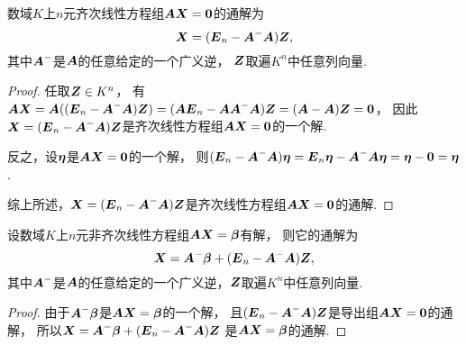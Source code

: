 \begin{theorem}[齐次线性方程组的解的结构定理]\label{theorem:线性方程组.齐次线性方程组的解的结构定理}
数域\(K\)上\(n\)元齐次线性方程组\(\vb{A} \vb{X} = \vb0\)的通解为\begin{equation}\label{equation:线性方程组.齐次线性方程组的通解}
	\vb{X}=(\vb{E}_n - \vb{A}^- \vb{A}) \vb{Z},
\end{equation}
其中\(\vb{A}^-\)是\(\vb{A}\)的任意给定的一个广义逆，
\(\vb{Z}\)取遍\(K^n\)中任意列向量.
\begin{proof}
任取\(\vb{Z} \in K^n\)，
有\(
	\vb{A} \vb{X}
	= \vb{A}
	(
		(\vb{E}_n - \vb{A}^- \vb{A})
		\vb{Z}
	)
	= (\vb{A} \vb{E}_n - \vb{A} \vb{A}^- \vb{A}) \vb{Z}
	= (\vb{A} - \vb{A}) \vb{Z}
	= \vb0
\)，
因此\(\vb{X} = (\vb{E}_n - \vb{A}^- \vb{A}) \vb{Z}\)是齐次线性方程组\(\vb{A} \vb{X} = \vb0\)的一个解.

反之，设\(\vb\eta\)是\(\vb{A} \vb{X} = \vb0\)的一个解，
则\(
	(\vb{E}_n - \vb{A}^- \vb{A}) \vb\eta
	= \vb{E}_n \vb\eta - \vb{A}^- \vb{A} \vb\eta
	= \vb\eta - \vb0
	= \vb\eta
\).

综上所述，\(\vb{X} = (\vb{E}_n - \vb{A}^- \vb{A}) \vb{Z}\)是齐次线性方程组\(\vb{A} \vb{X} = \vb0\)的通解.
\end{proof}
\end{theorem}

\begin{corollary}\label{theorem:线性方程组.齐次线性方程组的解的结构定理.推论1}
设数域\(K\)上\(n\)元非齐次线性方程组\(\vb{A} \vb{X} = \vb\beta\)有解，
则它的通解为\begin{equation}\label{equation:线性方程组.非齐次线性方程组的通解2}
	\vb{X} = \vb{A}^- \vb\beta + (\vb{E}_n - \vb{A}^- \vb{A}) \vb{Z},
\end{equation}
其中\(\vb{A}^-\)是\(\vb{A}\)的任意给定的一个广义逆，\(\vb{Z}\)取遍\(K^n\)中任意列向量.
\begin{proof}
由于\(\vb{A}^- \vb\beta\)是\(\vb{A} \vb{X} = \vb\beta\)的一个解，
且\((\vb{E}_n - \vb{A}^- \vb{A}) \vb{Z}\)是导出组\(\vb{A} \vb{X} = \vb0\)的通解，
所以\(\vb{X} = \vb{A}^- \vb\beta + (\vb{E}_n - \vb{A}^- \vb{A}) \vb{Z}\)
是\(\vb{A} \vb{X} = \vb\beta\)的通解.
\end{proof}
\end{corollary}

